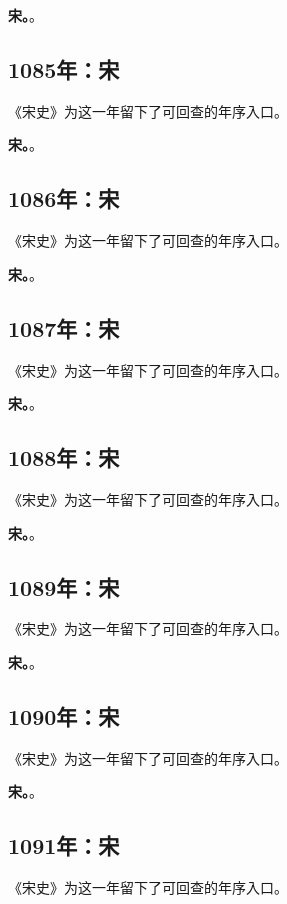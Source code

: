 \noindent\textbf{宋。}。

\subsection{1085年：宋}
《宋史》为这一年留下了可回查的年序入口。

\noindent\textbf{宋。}。

\subsection{1086年：宋}
《宋史》为这一年留下了可回查的年序入口。

\noindent\textbf{宋。}。

\subsection{1087年：宋}
《宋史》为这一年留下了可回查的年序入口。

\noindent\textbf{宋。}。

\subsection{1088年：宋}
《宋史》为这一年留下了可回查的年序入口。

\noindent\textbf{宋。}。

\subsection{1089年：宋}
《宋史》为这一年留下了可回查的年序入口。

\noindent\textbf{宋。}。

\subsection{1090年：宋}
《宋史》为这一年留下了可回查的年序入口。

\noindent\textbf{宋。}。

\subsection{1091年：宋}
《宋史》为这一年留下了可回查的年序入口。

